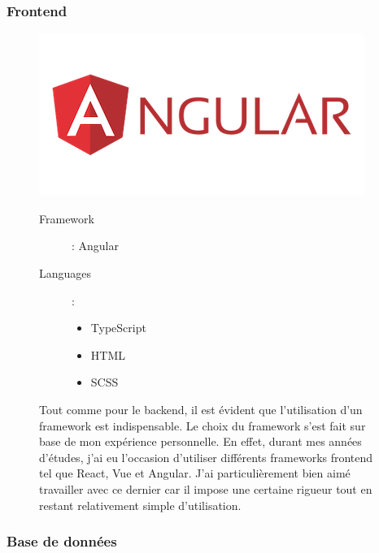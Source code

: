 \subsubsection{Frontend}
\begin{figure}[H]
  \begin{minipage}{.3\textwidth}
    \includegraphics[width=0.75\linewidth]{img/tech/Angular.png}
  \end{minipage}
  \begin{minipage}{.7\textwidth}
    \begin{description}
      \item[Framework]: Angular
      \item[Languages]: \begin{itemize}
        \item TypeScript
        \item HTML
        \item SCSS
      \end{itemize} 
    \end{description}
    Tout comme pour le backend, il est évident que l'utilisation d'un framework est indispensable. Le choix du framework s'est fait sur base de mon expérience personnelle. En effet, durant mes années d'études, j'ai eu l'occasion d'utiliser différents frameworks frontend tel que React, Vue et Angular. J'ai particulièrement bien aimé travailler avec ce dernier car il impose une certaine rigueur tout en restant relativement simple d'utilisation.
  \end{minipage}
\end{figure}

\newpage

\subsubsection{Base de données}


